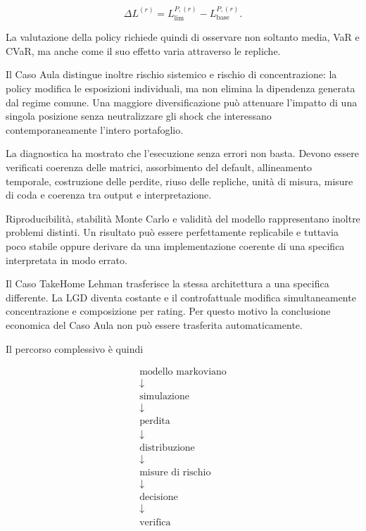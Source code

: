 \[
\Delta L^{(r)}
=
L_{\mathrm{lim}}^{P,(r)}
-
L_{\mathrm{base}}^{P,(r)}.
\]

La valutazione della policy richiede quindi di osservare non soltanto media,
VaR e CVaR, ma anche come il suo effetto varia attraverso le repliche.

Il Caso Aula distingue inoltre rischio sistemico e rischio di concentrazione:
la policy modifica le esposizioni individuali, ma non elimina la dipendenza
generata dal regime comune. Una maggiore diversificazione pu\`o attenuare
l'impatto di una singola posizione senza neutralizzare gli shock che
interessano contemporaneamente l'intero portafoglio.

La diagnostica ha mostrato che l'esecuzione senza errori non basta. Devono
essere verificati coerenza delle matrici, assorbimento del default,
allineamento temporale, costruzione delle perdite, riuso delle repliche,
unit\`a di misura, misure di coda e coerenza tra output e interpretazione.

Riproducibilit\`a, stabilit\`a Monte Carlo e validit\`a del modello
rappresentano inoltre problemi distinti. Un risultato pu\`o essere
perfettamente replicabile e tuttavia poco stabile oppure derivare da una
implementazione coerente di una specifica interpretata in modo errato.

Il Caso TakeHome Lehman trasferisce la stessa architettura a una specifica
differente. La $\mathrm{LGD}$ diventa costante e il controfattuale modifica
simultaneamente concentrazione e composizione per rating. Per questo motivo
la conclusione economica del Caso Aula non pu\`o essere trasferita
automaticamente.

Il percorso complessivo \`e quindi

\begin{gather*}
\text{modello markoviano} \\
\downarrow \\
\text{simulazione} \\
\downarrow \\
\text{perdita} \\
\downarrow \\
\text{distribuzione} \\
\downarrow \\
\text{misure di rischio} \\
\downarrow \\
\text{decisione} \\
\downarrow \\
\text{verifica}
\end{gather*}

